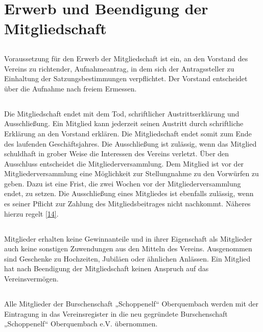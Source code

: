 \section{Erwerb und Beendigung der Mitgliedschaft}
	\subsection{} Voraussetzung für den Erwerb der Mitgliedschaft ist ein, an den Vorstand des Vereins zu richtender, Aufnahmeantrag, in dem sich der Antragssteller zu Einhaltung der Satzungsbestimmungen verpflichtet. Der Vorstand entscheidet über die Aufnahme nach freiem Ermessen.
	
	\subsection{} Die Mitgliedschaft endet mit dem Tod, schriftlicher Austrittserklärung und Ausschließung. Ein Mitglied kann jederzeit seinen Austritt durch schriftliche Erklärung an den Vorstand erklären. Die Mitgliedschaft endet somit zum Ende des laufenden Geschäftsjahres. 
	Die Ausschließung ist zulässig, wenn das Mitglied schuldhaft in grober Weise die Interessen des Vereins verletzt. Über den Ausschluss entscheidet die Mitgliederversammlung. Dem Mitglied ist vor der Mitgliederversammlung eine Möglichkeit zur Stellungnahme zu den Vorwürfen zu geben. Dazu ist eine Frist, die zwei Wochen vor der Mitgliederversammlung endet, zu setzen. Die Ausschließung eines Mitgliedes ist ebenfalls zulässig, wenn es seiner Pflicht zur Zahlung des Mitgliedsbeitrages nicht nachkommt. Näheres hierzu regelt \ref{14}.
	
	\subsection{} Mitglieder erhalten keine Gewinnanteile und in ihrer Eigenschaft als Mitglieder auch keine sonstigen Zuwendungen aus den Mitteln des Vereins. Ausgenommen sind Geschenke zu Hochzeiten, Jubiläen oder ähnlichen Anlässen. Ein Mitglied hat nach Beendigung der Mitgliedschaft keinen Anspruch auf das Vereinsvermögen. 
	
	\subsection{} Alle Mitglieder der Burschenschaft „Schoppenelf“ Oberquembach werden mit der Eintragung in das Vereinsregister in die neu gegründete Burschenschaft „Schoppenelf“ Oberquembach e.V. übernommen.

